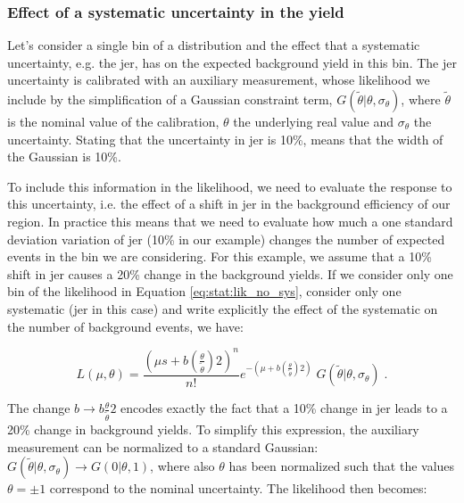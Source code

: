 \subsubsection*{Effect of a systematic uncertainty in the yield}

Let’s consider a single bin of a distribution and the effect that a systematic uncertainty, 
e.g. the \gls{jer}, has on the expected background yield in this bin. 
The \gls{jer} uncertainty is calibrated with an auxiliary measurement, whose likelihood we include by the simplification of a Gaussian constraint term, $G( \tilde{\theta} | \theta, \sigma_\theta)$, where $\tilde{\theta}$ is the nominal value of the calibration, $\theta$ the underlying real value and $\sigma_\theta$ the uncertainty. Stating that the uncertainty in \gls{jer} is 10\%, means that the width of the Gaussian is 10\%. 

To include this information in the likelihood, we need to evaluate the response to this uncertainty, i.e. the effect of a shift in \gls{jer} in the background efficiency of our region.
In practice this means that we need to evaluate how much a one standard deviation variation of \gls{jer} (10\% in our example) changes the number of expected events in the bin we are considering. 
For this example, we assume that a 10\% shift in \gls{jer} causes a 20\% change in the background yields.
If we consider only one bin of the likelihood in Equation \ref{eq:stat:lik_no_sys}, consider only one systematic (\gls{jer} in this case) and write explicitly the effect of the systematic on the number of background events, we have:

\begin{equation}
\label{eq:stat:lik_one_bin_sys_pre}
L(\mu, \theta) =
\frac{ (\mu s +
b \left( \frac{\theta}{\tilde{\theta}} \right) 2 )^{n} }{ n! }
e^{- (\mu  + b\left(\frac{\theta}{\tilde{\theta} }\right)2)}   \; 
G( \tilde{\theta} | \theta, \sigma_\theta) \; .
\end{equation}

\noindent The change $b \rightarrow b\frac{\theta}{\tilde{\theta} }2$ encodes exactly the fact that a 10\% change in \gls{jer} leads to a 20\% change in background yields. To simplify this expression, the auxiliary measurement can be normalized to a standard Gaussian: $G( \tilde{\theta} | \theta, \sigma_\theta) \rightarrow G( 0 | \theta, 1)$, where also $\theta$ has been normalized such that the values $\theta = \pm 1$ correspond to the nominal uncertainty. The likelihood then becomes:


